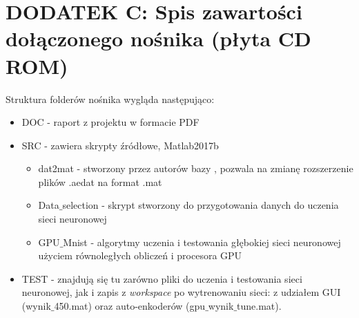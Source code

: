 \section{DODATEK C: Spis zawartości dołączonego nośnika (płyta CD ROM)}
\label{sub:dodatekC}


Struktura folderów nośnika wygląda następująco:
\begin{itemize}
\item DOC - raport z projektu w formacie PDF
\item SRC - zawiera skrypty źródłowe, Matlab2017b
\begin{itemize}
\item dat2mat - stworzony przez autorów bazy \cite{MNIST_DVS}, pozwala na zmianę rozszerzenie plików .aedat na format .mat
\item Data$\_$selection - skrypt stworzony do przygotowania danych do uczenia sieci neuronowej
\item GPU$\_$Mnist - algorytmy uczenia i testowania głębokiej sieci neuronowej użyciem równoległych obliczeń i procesora GPU
\end{itemize}

\item TEST - znajdują się tu zarówno pliki do uczenia i testowania sieci neuronowej, jak i zapis z \textit{workspace} po wytrenowaniu sieci: z udziałem GUI (wynik$\_$450.mat) oraz auto-enkoderów (gpu$\_$wynik$\_$tune.mat).
\end{itemize}